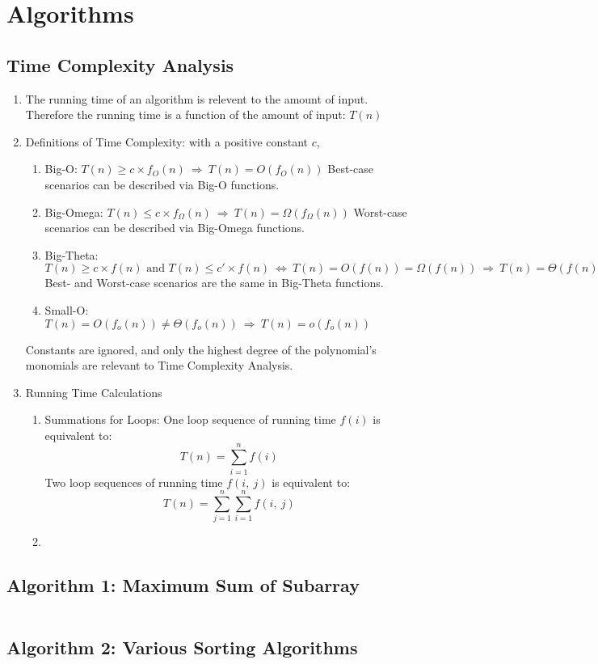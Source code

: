 \part{Algorithms}

\chapter{Time Complexity Analysis}
\begin{enumerate}
\item The running time of an algorithm is relevent to the amount of input.
    Therefore the running time is a function of the amount of input: $T(n)$
\item Definitions of Time Complexity: with a positive constant $c$,
    \begin{enumerate}
    \item Big-O: $T(n)\geq c\times f_O(n)~\Rightarrow~T(n)=O\left(f_O(n)\right)$
        Best-case scenarios can be described via Big-O functions.
    \item Big-Omega: $T(n)\leq c\times f_{\Omega}(n)~\Rightarrow~T(n)=\Omega
        \left(f_{\Omega}(n)\right)$ Worst-case scenarios can be described via
        Big-Omega functions.
    \item Big-Theta: $T(n)\geq c\times f(n)\text{ and }T(n)\leq c'\times f(n)~
        \Leftrightarrow~T(n)=O(f(n))=\Omega(f(n))~\Rightarrow~T(n)=\Theta(f(n))$
        Best- and Worst-case scenarios are the same in Big-Theta functions.
    \item Small-O: $T(n)=O(f_o(n))\neq\Theta(f_o(n))~\Rightarrow~T(n)=o(f_o(n))$
    \end{enumerate}
    Constants are ignored, and only the highest degree of the polynomial's
    monomials are relevant to Time Complexity Analysis.
\item Running Time Calculations
    \begin{enumerate}
    \item Summations for Loops: One loop sequence of running time $f(i)$ is
        equivalent to: \[ T(n)=\sum_{i=1}^nf(i) \] Two loop sequences of running
        time $f(i,~j)$ is equivalent to:\[T(n)=\sum_{j=1}^n\sum_{i=1}^nf(i,~j)\]
    \item
    \end{enumerate}
\end{enumerate}

\chapter{Algorithm 1: Maximum Sum of Subarray}
\inputminted{cpp}{../Algorithms/maxsubarray.cpp}

\chapter{Algorithm 2: Various Sorting Algorithms}
\inputminted{cpp}{../Algorithms/sort.hpp}

